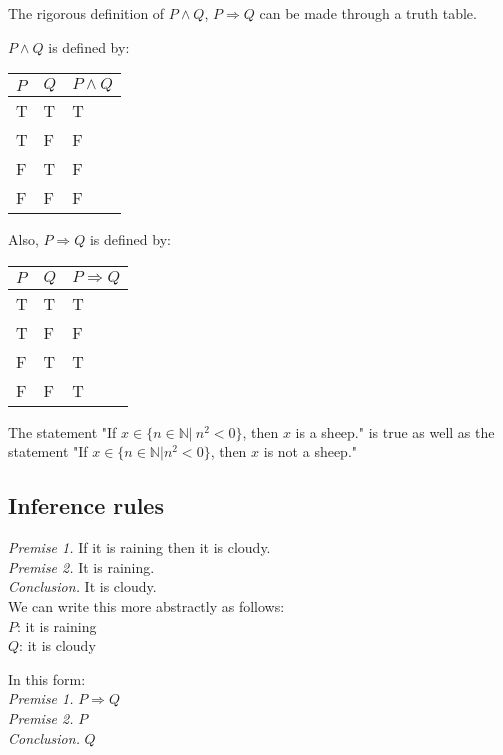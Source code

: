 The rigorous definition of $P \wedge Q$, $P \Rightarrow Q$ can be made through a truth table.

\begin{df}
$P \wedge Q$ is defined by:
\begin{center}

\begin{tabularx}{.25\textwidth}{XXX}
\toprule
$P$ & $Q$ & $P \wedge Q$ \\
\toprule
T & T & T \\
T & F & F \\
F & T & F \\
F & F & F \\
\bottomrule
\end{tabularx}
\end{center}
\end{df}
\begin{df}
Also, $P \Rightarrow Q$ is defined by:
\begin{center}
\begin{tabularx}{.27\textwidth}{XXX}
\toprule
$P$ & $Q$ & $P \Rightarrow Q$ \\
\toprule
T & T & T \\
T & F & F \\
F & T & T \\
F & F & T \\
\bottomrule
\end{tabularx}
\end{center}
\end{df}

\begin{ex}
The statement 
"If $x \in \{n \in \mathbb N | ~n^2 <0 \}$, then $x$ is a sheep."
is true as well as the statement
"If $x \in \{n \in \mathbb N | n^2 <0 \}$, then $x$ is not a sheep."
\end{ex}
\subsection{Inference rules}
\begin{ex}
\emph{Premise 1.} If it is raining then it is cloudy. \\
\emph{Premise 2.} It is raining. \\
\emph{Conclusion.} It is cloudy. \\

We can write this more abstractly as follows: \\
$P$: it is raining \\
$Q$: it is cloudy 

In this form: \\
\emph{Premise 1.} $P \Rightarrow Q$ \\
\emph{Premise 2.} $P$ \\
\emph{Conclusion.} $Q$
\end{ex}

